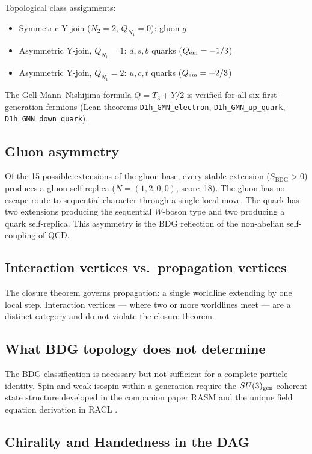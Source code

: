 \documentclass[11pt,a4paper]{article}
\newcommand{\SBDG}{S_{\mathrm{BDG}}}
\begin{document}
Topological class assignments:
\begin{itemize}
\item Symmetric Y-join ($N_2=2$, $Q_{N_1}=0$): gluon $g$
\item Asymmetric Y-join, $Q_{N_1}=1$: $d,s,b$ quarks ($Q_{\rm em}=-1/3$)
\item Asymmetric Y-join, $Q_{N_1}=2$: $u,c,t$ quarks ($Q_{\rm em}=+2/3$)
\end{itemize}

The Gell-Mann--Nishijima formula $Q=T_3+Y/2$ is verified for all six first-generation fermions
(Lean theorems \texttt{D1h\_GMN\_electron}, \texttt{D1h\_GMN\_up\_quark},
\texttt{D1h\_GMN\_down\_quark}).

\subsection{Gluon asymmetry}

Of the 15 possible extensions of the gluon base, every stable extension ($\SBDG>0$)
produces a gluon self-replica ($N=(1,2,0,0)$, score~18).  The gluon has no escape route to
sequential character through a single local move.  The quark has two extensions producing
the sequential $W$-boson type and two producing a quark self-replica.  This asymmetry is
the BDG reflection of the non-abelian self-coupling of QCD.

\subsection{Interaction vertices vs.\ propagation vertices}

The closure theorem governs propagation: a single worldline extending by one local step.
Interaction vertices --- where two or more worldlines meet --- are a distinct category and
do not violate the closure theorem.

\subsection{What BDG topology does not determine}

The BDG classification is necessary but not sufficient for a complete particle identity.
Spin and weak isospin within a generation require the $SU(3)_{\rm gen}$ coherent state
structure developed in the companion paper RASM \citep{Sandeman2026RASM} and the unique
field equation derivation in RACL \citep{Sandeman2026RACL}.

\subsection{Chirality and Handedness in the DAG}
\label{sec:chirality}
\end{document}
